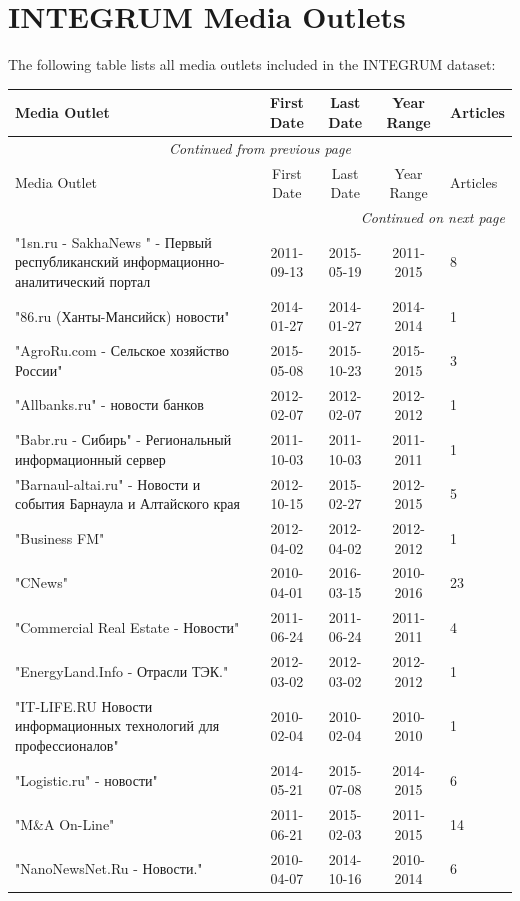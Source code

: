 \section{INTEGRUM Media Outlets}
\label{app:integrum_outlets}

The following table lists all media outlets included in the INTEGRUM dataset:

\begin{longtable}{p{6cm}cccp{2cm}}
\toprule
Media Outlet & First Date & Last Date & Year Range & Articles\\
\midrule
\endfirsthead
\multicolumn{5}{c}{\textit{Continued from previous page}}\\
\toprule
Media Outlet & First Date & Last Date & Year Range & Articles\\
\midrule
\endhead
\midrule
\multicolumn{5}{r}{\textit{Continued on next page}}\\
\endfoot
\bottomrule
\endlastfoot
"1sn.ru - SakhaNews " - Первый республиканский информационно-аналитический портал & 2011-09-13 & 2015-05-19 & 2011-2015 & 8\\
"86.ru (Ханты-Мансийск) новости" & 2014-01-27 & 2014-01-27 & 2014-2014 & 1\\
"AgroRu.com - Сельское хозяйство России" & 2015-05-08 & 2015-10-23 & 2015-2015 & 3\\
"Allbanks.ru" - новости банков & 2012-02-07 & 2012-02-07 & 2012-2012 & 1\\
"Babr.ru - Сибирь" - Региональный информационный сервер & 2011-10-03 & 2011-10-03 & 2011-2011 & 1\\
"Barnaul-altai.ru" - Новости и события Барнаула и Алтайского края & 2012-10-15 & 2015-02-27 & 2012-2015 & 5\\
"Business FM" & 2012-04-02 & 2012-04-02 & 2012-2012 & 1\\
"CNews" & 2010-04-01 & 2016-03-15 & 2010-2016 & 23\\
"Commercial Real Estate - Новости" & 2011-06-24 & 2011-06-24 & 2011-2011 & 4\\
"EnergyLand.Info - Отрасли ТЭК." & 2012-03-02 & 2012-03-02 & 2012-2012 & 1\\
"IT-LIFE.RU Новости информационных технологий для профессионалов" & 2010-02-04 & 2010-02-04 & 2010-2010 & 1\\
"Logistic.ru" - новости" & 2014-05-21 & 2015-07-08 & 2014-2015 & 6\\
"M\&A On-Line" & 2011-06-21 & 2015-02-03 & 2011-2015 & 14\\
"NanoNewsNet.Ru - Новости." & 2010-04-07 & 2014-10-16 & 2010-2014 & 6\\

\end{longtable}
